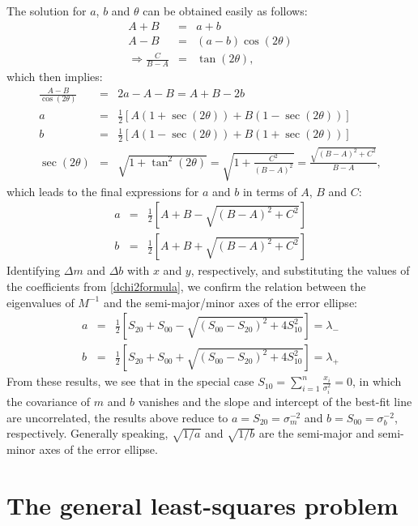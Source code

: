 \documentclass{article}
\begin{document}
The solution for $a$, $b$ and $\theta$ can be obtained easily as follows:
\begin{eqnarray}
  A + B &=& a + b \\
  A - B &=& (a-b)\cos (2\theta) \\
  \Rightarrow \frac{C}{B-A} &=& \tan(2\theta), 
\end{eqnarray}
which then implies:
\begin{eqnarray}
  \frac{A-B}{\cos (2\theta)} &=& 2a - A - B = A + B - 2b \\
  a &=& \frac{1}{2}\left[ A(1+\sec(2\theta)) + B(1-\sec(2\theta))\right] \\
  b &=& \frac{1}{2}\left[ A(1-\sec(2\theta)) + B(1+\sec(2\theta))\right] \\
  \sec(2\theta) &=& \sqrt{1+\tan^2 (2\theta)} = \sqrt{ 1 + \frac{C^2}{(B-A)^2}} = \frac{\sqrt{(B-A)^2 + C^2}}{B-A}, 
\end{eqnarray}
which leads to the final expressions for $a$ and $b$ in terms of $A$, $B$ and $C$:
\begin{eqnarray}
  a &=& \frac{1}{2} \left[A+B - \sqrt{(B-A)^2 + C^2}\right]\\
  b &=& \frac{1}{2} \left[A+B + \sqrt{(B-A)^2 + C^2}\right]  
\end{eqnarray}
Identifying $\Delta m$ and $\Delta b$ with $x$ and $y$, respectively, and substituting the values of the coefficients from \eqref{dchi2formula}, we confirm the relation between the eigenvalues of $M^{-1}$ and the semi-major/minor axes of the error ellipse: 
\begin{eqnarray}
  a &=& \frac{1}{2} \left[ S_{20} + S_{00} - \sqrt{ (S_{00}-S_{20})^2 + 4S_{10}^2 } \right] = \lambda_{-} \\
  b &=& \frac{1}{2} \left[ S_{20} + S_{00} + \sqrt{ (S_{00}-S_{20})^2 + 4S_{10}^2 } \right] = \lambda_{+}
\end{eqnarray}
From these results, we see that in the special case $S_{10} = \sum_{i=1}^{n} \frac{x_i}{\sigma_i^2} = 0$, in which the covariance of $m$ and $b$ vanishes and the slope and intercept of the best-fit line are uncorrelated, the results above reduce to $a = S_{20} = \sigma_m^{-2}$ and $b = S_{00} = \sigma_b^{-2}$, respectively. Generally speaking, $\sqrt{1/a}$ and $\sqrt{1/b}$ are the semi-major and semi-minor axes of the error ellipse.
\section{The general least-squares problem}
\end{document}
